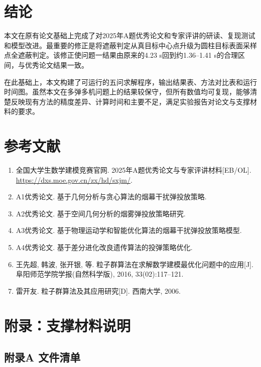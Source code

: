 \documentclass[12pt,a4paper]{article}
\begin{document}
\section{结论}

本文在原有论文基础上完成了对2025年A题优秀论文和专家评讲的研读、复现测试和模型改进。最重要的修正是将遮蔽判定从真目标中心点升级为圆柱目标表面采样点全遮蔽判定。该修正使问题一结果由原来的4.23 s回到约1.36--1.41 s的合理区间，与优秀论文结果一致。

在此基础上，本文构建了可运行的五问求解程序，输出结果表、方法对比表和运行时间图。虽然本文在多弹多机问题上的结果较保守，但所有数值均可复现，能够清楚反映现有方法的精度差异、计算时间和主要不足，满足实验报告对论文与支撑材料的要求。

\newpage
\section*{参考文献}
\begin{enumerate}
\item 全国大学生数学建模竞赛官网. 2025年A题优秀论文与专家评讲材料[EB/OL]. \url{https://dxs.moe.gov.cn/zx/hd/sxjm/}.
\item A1优秀论文. 基于几何分析与贪心算法的烟幕干扰弹投放策略.
\item A2优秀论文. 基于空间几何分析的烟雾弹投放策略研究.
\item A3优秀论文. 基于物理运动学和智能优化算法的烟幕干扰弹投放策略模型.
\item A4优秀论文. 基于差分进化改良遗传算法的投弹策略优化.
\item 王先超, 韩波, 张开银, 等. 粒子群算法在求解数学建模最优化问题中的应用[J]. 阜阳师范学院学报(自然科学版), 2016, 33(02):117--121.
\item 雷开友. 粒子群算法及其应用研究[D]. 西南大学, 2006.
\end{enumerate}

\newpage
\section*{附录：支撑材料说明}

\subsection*{附录A 文件清单}
\end{document}
